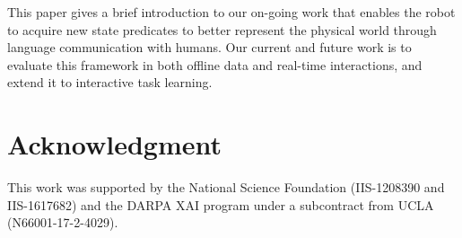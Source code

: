 \documentclass[letterpaper]{article} %
\begin{document}
This paper gives a brief introduction to our on-going work that enables the robot to acquire new state predicates to better represent the physical world through language communication with humans. Our current and future work is to evaluate this framework in both offline data and real-time interactions, and extend it to interactive task learning.

\section{Acknowledgment}
This work was supported by the National Science Foundation (IIS-1208390 and IIS-1617682) and the DARPA XAI program under a subcontract from UCLA (N66001-17-2-4029).




\end{document}
